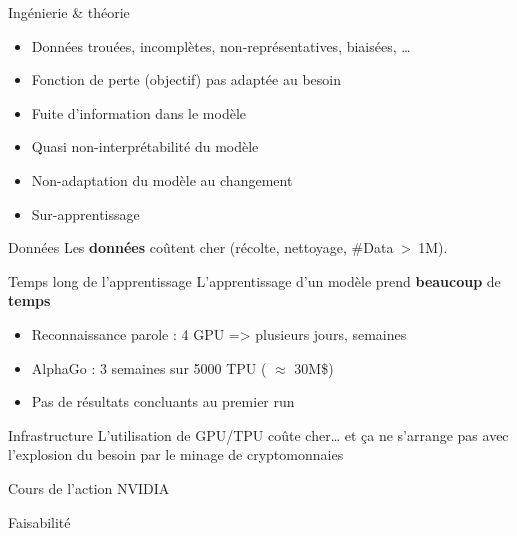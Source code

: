 \begin{frame}{Ingénierie \& théorie}
  \begin{itemize}[<+->]
    \item Données trouées, incomplètes, non-représentatives, biaisées, …
    \item Fonction de perte (objectif) pas adaptée au besoin
    \item Fuite d'information dans le modèle
    \item Quasi non-interprétabilité du modèle
    \item Non-adaptation du modèle au changement
    \item Sur-apprentissage
  \end{itemize}
\end{frame}

\begin{frame}{Données}
  Les \textbf{données} coûtent cher (récolte, nettoyage, \#Data~>~1M). 
\end{frame}

\begin{frame}{Temps long de l'apprentissage}
  L'apprentissage d'un modèle prend \textbf{beaucoup} de \textbf{temps}
  \begin{itemize}[<+->]
    \item Reconnaissance parole : 4 GPU => plusieurs jours, semaines
    \item AlphaGo : 3 semaines sur 5000 TPU ( $\approx$ 30M\$)
    \item Pas de résultats concluants au premier run
  \end{itemize}
\end{frame}

\begin{frame}{Infrastructure}
  L'utilisation de GPU/TPU coûte cher… et ça ne s'arrange pas avec l'explosion du besoin par le minage de cryptomonnaies
  \begin{center}
    \small Cours de l'action NVIDIA
  \end{center}
\end{frame}

\begin{frame}{Faisabilité}
\end{frame}


